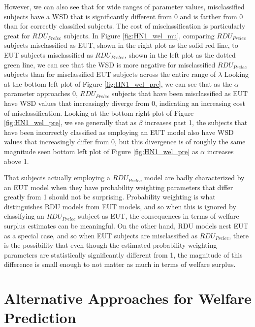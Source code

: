 \documentclass[../main.tex]{subfiles}
\begin{document}
However, we can also see that for wide ranges of parameter values, misclassified subjects have a WSD that is significantly different from 0 and is farther from 0 than for correctly classified subjects.
The cost of misclassification is particularly great for $\mathit{RDU_{Prelec}}$ subjects.
In Figure \ref{fig:HN1_wel_mu}, comparing $\mathit{RDU_{Prelec}}$ subjects misclassified as EUT, shown in the right plot as the solid red line, to EUT subjects misclassified as $\mathit{RDU_{Prelec}}$, shown in the left plot as the dotted green line, we can see that the WSD is more negative for misclassified $\mathit{RDU_{Prelec}}$ subjects than for misclassified EUT subjects across the entire range of $\lambda$
Looking at the bottom left plot of Figure \ref{fig:HN1_wel_pre}, we can see that as the $\alpha$ parameter approaches 0, $\mathit{RDU_{Prelec}}$ subjects that have been misclassified as EUT have WSD values that increasingly diverge from 0, indicating an increasing cost of misclassification.
Looking at the bottom right plot of  Figure \ref{fig:HN1_wel_pre}, we see generally that as $\beta$ increases past 1, the subjects that have been incorrectly classified as employing an EUT model also have WSD values that increasingly differ from 0, but this divergence is of roughly the same magnitude seen bottom left plot of Figure \ref{fig:HN1_wel_pre} as $\alpha$ increases above 1.

That subjects actually employing a $\mathit{RDU_{Prelec}}$ model are badly characterized by an EUT model when they have probability weighting parameters that differ greatly from 1 should not be surprising.
Probability weighting is what distinguishes RDU models from EUT models, and so when this is ignored by classifying an $\mathit{RDU_{Prelec}}$ subject as EUT, the consequences in terms of welfare surplus estimates can be meaningful.
On the other hand, RDU models nest EUT as a special case, and so when EUT subjects are misclassified as $\mathit{RDU_{Prelec}}$, there is the possibility that even though the estimated probability weighting parameters are statistically significantly different from 1, the magnitude of this difference is small enough to not matter as much in terms of welfare surplus.

\section{Alternative Approaches for Welfare Prediction}
\end{document}
